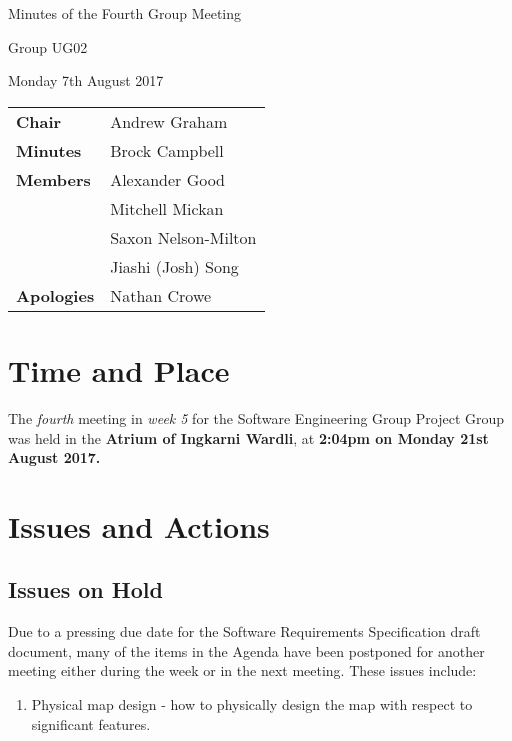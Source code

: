 \documentclass{article}
\begin{document}
\begin{center}    
{\huge Minutes of the Fourth Group Meeting \par}
\vspace{0.5cm}
{\large Group UG02 \par}
\vspace{0.5cm}
{\large Monday 7th August 2017 \par}
\vspace{0.5cm}
\end{center}

\begin{flushleft}
\begin{tabular}{ll}
{\bfseries Chair} & Andrew Graham \\
{\bfseries Minutes} & Brock Campbell \\
{\bfseries Members}
 & Alexander Good \\
 & Mitchell Mickan \\
 & Saxon Nelson-Milton \\
 & Jiashi (Josh) Song \\
{\bfseries Apologies} & Nathan Crowe\\
\end{tabular}
\end{flushleft}

\section{Time and Place}
The {\itshape fourth} meeting in {\itshape week 5} for the Software Engineering Group Project Group was held in the {\bfseries Atrium of Ingkarni Wardli}, at {\bfseries 2:04pm on Monday 21st August 2017.} 

\section{Issues and Actions}
	\subsection{Issues on Hold}
    Due to a pressing due date for the Software Requirements Specification draft document, many of the items in the Agenda have been postponed for another meeting either during the week or in the next meeting. These issues include:
    \begin{enumerate}
    \item Physical map design - how to physically design the map with respect to significant features.
    \end{enumerate}
\end{document}
